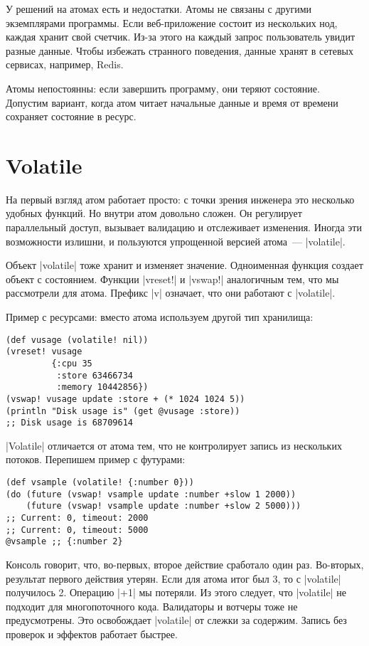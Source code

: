 У решений на атомах есть и недостатки. Атомы не связаны с другими экземплярами
программы. Если веб-приложение состоит из нескольких нод, каждая хранит свой
счетчик. Из-за этого на каждый запрос пользователь увидит разные данные. Чтобы
избежать странного поведения, данные хранят в сетевых сервисах, например, Redis.

Атомы непостоянны: если завершить программу, они теряют состояние. Допустим
вариант, когда атом читает начальные данные и время от времени сохраняет
состояние в ресурс.

\section{Volatile}

На первый взгляд атом работает просто: с точки зрения инженера это несколько
удобных функций. Но внутри атом довольно сложен. Он регулирует параллельный
доступ, вызывает валидацию и отслеживает изменения. Иногда эти возможности
излишни, и пользуются упрощенной версией атома~--- \spverb|volatile|.

Объект \spverb|volatile| тоже хранит и изменяет значение. Одноименная функция
создает объект с состоянием. Функции \spverb|vreset!| и \spverb|vswap!|
аналогичным тем, что мы рассмотрели для атома. Префикс \spverb|v| означает, что
они работают с \spverb|volatile|.

Пример с ресурсами: вместо атома используем другой тип хранилища:

\begin{verbatim}
(def vusage (volatile! nil))
(vreset! vusage
         {:cpu 35
          :store 63466734
          :memory 10442856})
(vswap! vusage update :store + (* 1024 1024 5))
(println "Disk usage is" (get @vusage :store))
;; Disk usage is 68709614
\end{verbatim}

\spverb|Volatile| отличается от атома тем, что не контролирует запись из
нескольких потоков. Перепишем пример с футурами:

\begin{verbatim}
(def vsample (volatile! {:number 0}))
(do (future (vswap! vsample update :number +slow 1 2000))
    (future (vswap! vsample update :number +slow 2 5000)))
;; Current: 0, timeout: 2000
;; Current: 0, timeout: 5000
@vsample ;; {:number 2}
\end{verbatim}

Консоль говорит, что, во-первых, второе действие сработало один раз. Во-вторых,
результат первого действия утерян. Если для атома итог был 3, то с
\spverb|volatile| получилось 2. Операцию \spverb|+1| мы потеряли. Из этого
следует, что \spverb|volatile| не подходит для многопоточного кода. Валидаторы и
вотчеры тоже не предусмотрены. Это освобождает \spverb|volatile| от слежки за
содержим. Запись без проверок и эффектов работает быстрее.

